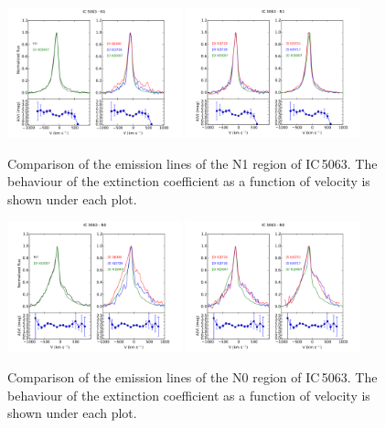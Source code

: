 \documentclass[../main.tex]{subfiles}
\begin{document}
\begin{figure}
\centering
\includegraphics[width=0.45\textwidth]{images/paper1/IC5063_n1_l1.pdf} \quad
\includegraphics[width=0.45\textwidth]{images/paper1/IC5063_n1_l2.pdf}\\
\caption[]{Comparison of the emission lines of the N1 region of IC\,5063. The behaviour of the extinction coefficient as a function of velocity is shown under each plot.}
\label{fig:n1l1_I}
\end{figure}


\begin{figure}
\centering
\includegraphics[width=0.45\textwidth]{images/paper1/IC5063_n0_l1.pdf} \quad
\includegraphics[width=0.45\textwidth]{images/paper1/IC5063_n0_l2.pdf}\\
\caption[]{Comparison of the emission lines of the N0 region of IC\,5063. The behaviour of the extinction coefficient as a function of velocity is shown under each plot.}
\label{fig:n0l1_I}
\end{figure}
\end{document}
